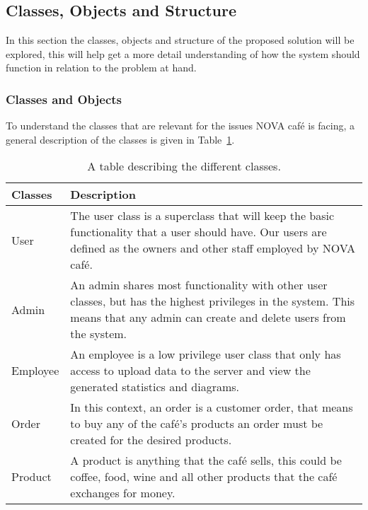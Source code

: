 \subsection{Classes, Objects and Structure}\label{subsec:classes-objects-and-structure}

In this section the classes, objects and structure of the proposed solution will be explored, this
will help get a more detail understanding of how the system should function in relation to the problem at hand.

\subsubsection{Classes and Objects}\label{subsubsec:classes-and-objects}

To understand the classes that are relevant for the issues NOVA café is facing,
a general description of the classes is given in Table~\ref{tab:class-table}.

\begin{table}[H]
    \centering
    \begin{tabular} { m{2.5cm} m{10cm} }
        \toprule
        \textbf{Classes} & \textbf{Description} \\
        \midrule
        User & The user class is a superclass that will keep the
        basic functionality that a user should have.
        Our users are defined as the owners and other staff employed by NOVA café. \\
        \midrule
        Admin & An admin shares most functionality with other user classes,
        but has the highest privileges in the system.
        This means that any admin can create and delete users from the system. \\
        \midrule
        Employee & An employee is a low privilege user class
        that only has access to upload data to the server and
        view the generated statistics and diagrams. \\
        \midrule
        Order & In this context, an order is a customer order,
        that means to buy any of the café's products an order must be created
        for the desired products. \\
        \midrule
        Product & A product is anything that the café sells,
        this could be coffee, food, wine and all other products that
        the café exchanges for money. \\
        \bottomrule
    \end{tabular}
    \caption{A table describing the different classes.
    }\label{tab:class-table}
\end{table}

